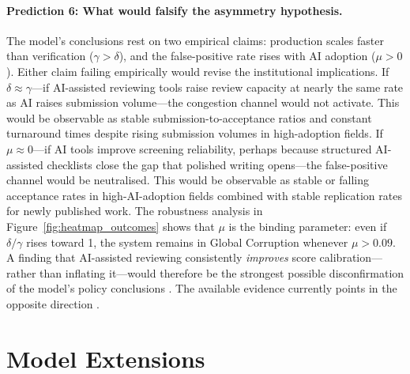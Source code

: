 \documentclass{article}
\begin{document}
\paragraph{Prediction 6: What would falsify the asymmetry hypothesis.}
The model's conclusions rest on two empirical claims: production scales faster than verification ($\gamma > \delta$), and the false-positive rate rises with AI adoption ($\mu > 0$).
Either claim failing empirically would revise the institutional implications.
If $\delta \approx \gamma$---if AI-assisted reviewing tools raise review capacity at nearly the same rate as AI raises submission volume---the congestion channel would not activate.
This would be observable as stable submission-to-acceptance ratios and constant turnaround times despite rising submission volumes in high-adoption fields.
If $\mu \approx 0$---if AI tools improve screening reliability, perhaps because structured AI-assisted checklists close the gap that polished writing opens---the false-positive channel would be neutralised.
This would be observable as stable or falling acceptance rates in high-AI-adoption fields combined with stable replication rates for newly published work.
The robustness analysis in Figure~\ref{fig:heatmap_outcomes} shows that $\mu$ is the binding parameter: even if $\delta/\gamma$ rises toward 1, the system remains in Global Corruption whenever $\mu > 0.09$.
A finding that AI-assisted reviewing consistently \emph{improves} score calibration---rather than inflating it---would therefore be the strongest possible disconfirmation of the model's policy conclusions \citep{Checco2021}.
The available evidence currently points in the opposite direction \citep{Latona2024, Liang2024ICML, Naddaf2025}.


\section{Model Extensions}
\label{app:extensions}
\end{document}
